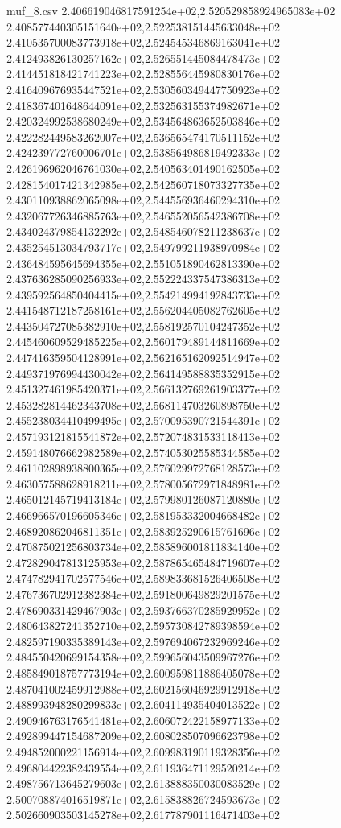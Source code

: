 \begin{filecontents*}{muf_8.csv}
2.406619046817591254e+02,2.520529858924965083e+02
2.408577440305151640e+02,2.522538151445633048e+02
2.410535700083773918e+02,2.524545346869163041e+02
2.412493826130257162e+02,2.526551445084478473e+02
2.414451818421741223e+02,2.528556445980830176e+02
2.416409676935447521e+02,2.530560349447750923e+02
2.418367401648644091e+02,2.532563155374982671e+02
2.420324992538680249e+02,2.534564863652503846e+02
2.422282449583262007e+02,2.536565474170511152e+02
2.424239772760006701e+02,2.538564986819492333e+02
2.426196962046761030e+02,2.540563401490162505e+02
2.428154017421342985e+02,2.542560718073327735e+02
2.430110938862065098e+02,2.544556936460294310e+02
2.432067726346885763e+02,2.546552056542386708e+02
2.434024379854132292e+02,2.548546078211238637e+02
2.435254513034793717e+02,2.549799211938970984e+02
2.436484595645694355e+02,2.551051890462813390e+02
2.437636285090256933e+02,2.552224337547386313e+02
2.439592564850404415e+02,2.554214994192843733e+02
2.441548712187258161e+02,2.556204405082762605e+02
2.443504727085382910e+02,2.558192570104247352e+02
2.445460609529485225e+02,2.560179489144811669e+02
2.447416359504128991e+02,2.562165162092514947e+02
2.449371976994430042e+02,2.564149588835352915e+02
2.451327461985420371e+02,2.566132769261903377e+02
2.453282814462343708e+02,2.568114703260898750e+02
2.455238034410499495e+02,2.570095390721544391e+02
2.457193121815541872e+02,2.572074831533118413e+02
2.459148076662982589e+02,2.574053025585344585e+02
2.461102898938800365e+02,2.576029972768128573e+02
2.463057588628918211e+02,2.578005672971848981e+02
2.465012145719413184e+02,2.579980126087120880e+02
2.466966570196605346e+02,2.581953332004668482e+02
2.468920862046811351e+02,2.583925290615761696e+02
2.470875021256803734e+02,2.585896001811834140e+02
2.472829047813125953e+02,2.587865465484719607e+02
2.474782941702577546e+02,2.589833681526406508e+02
2.476736702912382384e+02,2.591800649829201575e+02
2.478690331429467903e+02,2.593766370285929952e+02
2.480643827241352710e+02,2.595730842789398594e+02
2.482597190335389143e+02,2.597694067232969246e+02
2.484550420699154358e+02,2.599656043509967276e+02
2.485849018757773194e+02,2.600959811886405078e+02
2.487041002459912988e+02,2.602156046929912918e+02
2.488993948280299833e+02,2.604114935404013522e+02
2.490946763176541481e+02,2.606072422158977133e+02
2.492899447154687209e+02,2.608028507096623798e+02
2.494852000221156914e+02,2.609983190119328356e+02
2.496804422382439554e+02,2.611936471129520214e+02
2.498756713645279603e+02,2.613888350030083529e+02
2.500708874016519871e+02,2.615838826724593673e+02
2.502660903503145278e+02,2.617787901116471403e+02

\end{filecontents*}
